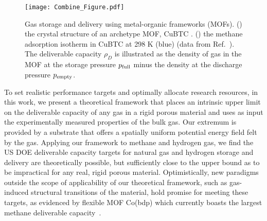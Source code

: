
\begin{figure}
    \centering
    \texttt{[image: Combine\_Figure.pdf]}
    \begin{minipage}{0.25\textwidth}
    \end{minipage}
    \begin{minipage}{0.25\textwidth}
    \end{minipage}
    
    \caption{\label{fig:fig1} Gas storage and delivery using metal-organic frameworks (MOFs). () the crystal structure of an archetype MOF, CuBTC \cite{chui1999chemically}. () the methane adsorption isotherm in CuBTC \cite{chui1999chemically} at 298 K (blue) (data from Ref.~\cite{mason2014evaluating}). The deliverable capacity $\rho_D$ is illustrated as the density of gas in the MOF at the storage pressure $p_{\text{full}}$ minus the density at the discharge pressure $p_{\text{empty}}$.}
\end{figure}

To set realistic performance targets and optimally allocate research resources,
in this work, we present a theoretical framework that places an intrinsic upper
limit on the deliverable capacity of any gas in a rigid porous material and
uses as input the experimentally measured properties of the bulk gas. Our
extremum is provided by a substrate that offers a spatially uniform potential
energy field felt by the gas. Applying our framework to methane and hydrogen
gas, we find the US DOE deliverable capacity targets for natural gas and
hydrogen storage and delivery are theoretically possible, but sufficiently
close to the upper bound as to be impractical for any real, rigid porous
material. Optimistically, new paradigms outside the scope of applicability of
our theoretical framework, such as gas-induced structural transitions of the
material, hold promise for meeting these targets, as evidenced by flexible MOF
Co(bdp) which currently boasts the largest methane deliverable
capacity~\cite{mason2015methane}.

